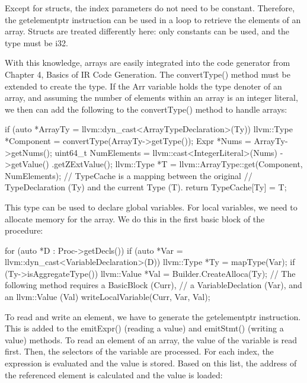 Except for structs, the index parameters do not need to be constant. Therefore, the getelementptr instruction can be used in a loop to retrieve the elements of an array. Structs are treated differently here: only constants can be used, and the type must be i32.

With this knowledge, arrays are easily integrated into the code generator from Chapter 4, Basics of IR Code Generation. The convertType() method must be extended to create the type. If the Arr variable holds the type denoter of an array, and assuming the number of elements within an array is an integer literal, we then can add the following to the convertType() method to handle arrays:

\begin{cpp}
if (auto *ArrayTy =
            llvm::dyn_cast<ArrayTypeDeclaration>(Ty)) {
    llvm::Type *Component =
        convertType(ArrayTy->getType());
    Expr *Nums = ArrayTy->getNums();
    uint64_t NumElements =
        llvm::cast<IntegerLiteral>(Nums)
            ->getValue()
            .getZExtValue();
    llvm::Type *T =
        llvm::ArrayType::get(Component, NumElements);
    // TypeCache is a mapping between the original
    // TypeDeclaration (Ty) and the current Type (T).
    return TypeCache[Ty] = T;
}
\end{cpp}

This type can be used to declare global variables. For local variables, we need to allocate memory for the array. We do this in the first basic block of the procedure:

\begin{cpp}
for (auto *D : Proc->getDecls()) {
    if (auto *Var =
            llvm::dyn_cast<VariableDeclaration>(D)) {
        llvm::Type *Ty = mapType(Var);
        if (Ty->isAggregateType()) {
            llvm::Value *Val = Builder.CreateAlloca(Ty);
            // The following method requires a BasicBlock (Curr),
            // a VariableDeclation (Var), and an llvm::Value (Val)
            writeLocalVariable(Curr, Var, Val);
        }
    }
}
\end{cpp}

To read and write an element, we have to generate the getelementptr instruction. This is added to the emitExpr() (reading a value) and emitStmt() (writing a value) methods. To read an element of an array, the value of the variable is read first. Then, the selectors of the variable are processed. For each index, the expression is evaluated and the value is stored. Based on this list, the address of the referenced element is calculated and the value is loaded:

